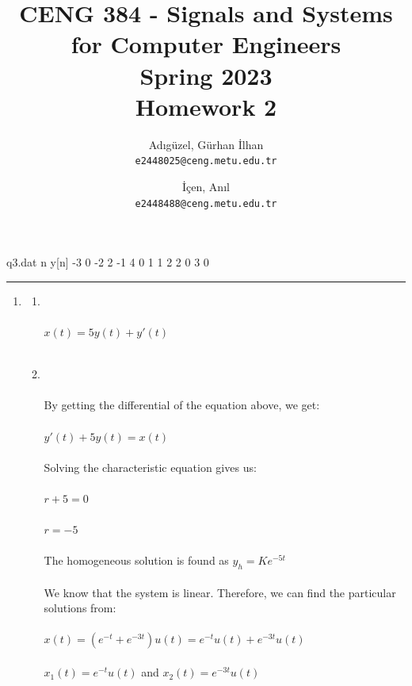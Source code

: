 \documentclass[10pt,a4paper, margin=1in]{article}
\author{
  Adıgüzel, Gürhan İlhan\\
  \texttt{e2448025@ceng.metu.edu.tr}
  \and
  İçen, Anıl\\
  \texttt{e2448488@ceng.metu.edu.tr}
}
\title{CENG 384 - Signals and Systems for Computer Engineers \\
Spring 2023 \\
Homework 2}
\begin{document}
\maketitle

\begin{filecontents}{q3.dat}
  n  y[n]
 -3  0
 -2  2
 -1  4
  0  1
  1  2
  2  0
  3  0
\end{filecontents}

\noindent\rule{19cm}{1.2pt}

\begin{enumerate}

\item %
    \begin{enumerate}
        \item %
        \\\\ $ x(t) =  5y(t) + y'(t)$
        \\\\
        \item %
        \\\\ By getting the differential of the equation above, we get:
        \\\\ \hspace*{50} $y'(t) + 5y(t) = x(t)$
        \\\\ Solving the characteristic equation gives us:
        \\\\ \hspace*{50} $r+5 = 0$
        \\\\ \hspace*{50} $r=-5$
        \\\\ The homogeneous solution is found as $y_{h} = Ke^{-5t}$
        \\\\ We know that the system is linear. Therefore, we can find the particular solutions from:
        \\\\ \hspace*{50} $x(t) = (e^{-t} + e^{-3t})u(t) = e^{-t}u(t) + e^{-3t}u(t)$
        \\\\ \hspace*{50} $x_{1}(t) =e^{-t}u(t) $ and $x_{2}(t) =e^{-3t}u(t)$

\end{enumerate}
\end{enumerate}
\end{document}
